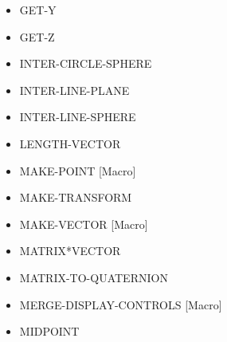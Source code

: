 \documentclass [11pt]{book}
\begin{document}
\begin{itemize}
\item {}GET-Y





\item {}GET-Z





\item {}INTER-CIRCLE-SPHERE





\item {}INTER-LINE-PLANE





\item {}INTER-LINE-SPHERE





\item {}LENGTH-VECTOR





\item {}MAKE-POINT [Macro]





\item {}MAKE-TRANSFORM





\item {}MAKE-VECTOR [Macro]





\item {}MATRIX*VECTOR





\item {}MATRIX-TO-QUATERNION





\item {}MERGE-DISPLAY-CONTROLS [Macro]





\item {}MIDPOINT






\end{itemize}
\end{document}
